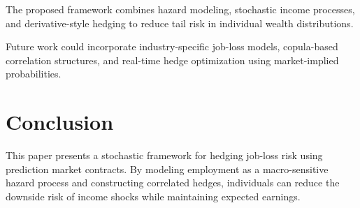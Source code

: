 \documentclass[11pt]{article}
\begin{document}
The proposed framework combines hazard modeling, stochastic income processes, 
and derivative-style hedging to reduce tail risk in individual wealth 
distributions.

Future work could incorporate industry-specific job-loss models, copula-based 
correlation structures, and real-time hedge optimization using market-implied 
probabilities.

\section{Conclusion}

This paper presents a stochastic framework for hedging job-loss risk using 
prediction market contracts. By modeling employment as a macro-sensitive hazard 
process and constructing correlated hedges, individuals can reduce the downside 
risk of income shocks while maintaining expected earnings.
\end{document}
